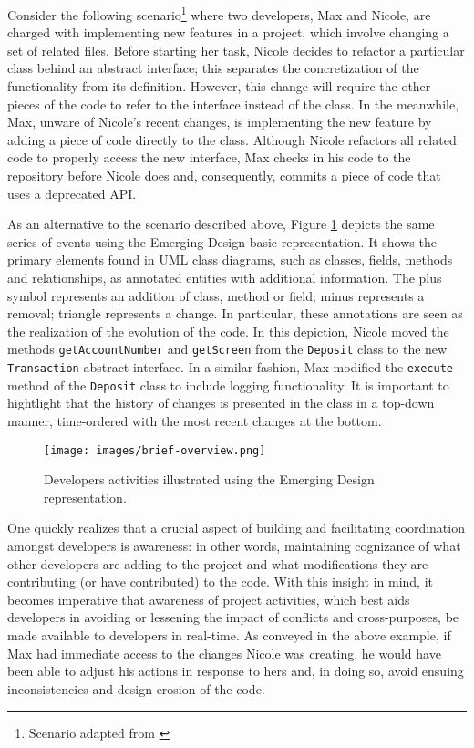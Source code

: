 \documentclass[10pt, conference, compsocconf]{IEEEtran}
\begin{document}
Consider the following scenario\footnote{Scenario adapted from \cite{daSilva:2006}} where two developers, Max and Nicole, are charged with implementing new features in a project, which involve changing a set of related files. Before starting her task, Nicole decides to refactor a particular class behind an abstract interface; this separates the concretization of the functionality from its definition. However, this change will require the other pieces of the code to refer to the interface instead of the class. In the meanwhile, Max, unware of Nicole's recent changes, is implementing the new feature by adding a piece of code directly to the class. Although Nicole refactors all related code to properly access the new interface, Max checks in his code to the repository before Nicole does and, consequently, commits a piece of code that uses a deprecated API. 

As an alternative to the scenario described above, Figure \ref{fig:brief-overview} depicts the same series of events using the Emerging Design basic representation. It shows the primary elements found in UML class diagrams, such as classes, fields, methods and relationships, as annotated entities with additional information. The plus symbol represents an addition of class, method or field; minus represents a removal; triangle represents a change. In particular, these annotations are seen as the realization of the evolution of the code. In this depiction, Nicole moved the methods \texttt{getAccountNumber} and \texttt{getScreen} from the \texttt{Deposit} class to the new \texttt{Transaction} abstract interface.  In a similar fashion, Max modified the \texttt{execute} method of the \texttt{Deposit} class to include logging functionality. It is important to hightlight that the history of changes is presented in the class in a top-down manner, time-ordered with the most recent changes at the bottom.  

\begin{figure}[!b]
	\centering
		\texttt{[image: images/brief-overview.png]}
	\caption{Developers activities illustrated using the Emerging Design representation.}
	\label{fig:brief-overview}
\end{figure}

One quickly realizes that a crucial aspect of building and facilitating coordination amongst developers is awareness: in other words, maintaining cognizance of what other developers are adding to the project and what modifications they are contributing (or have contributed) to the code. With this insight in mind, it becomes imperative that awareness of project activities, which best aids developers in avoiding or lessening the impact of conflicts and cross-purposes, be made available to developers in real-time. As conveyed in the above example, if Max had immediate access to the changes Nicole was creating, he would have been able to adjust his actions in response to hers and, in doing so, avoid ensuing inconsistencies and design erosion of the code.  
\end{document}
